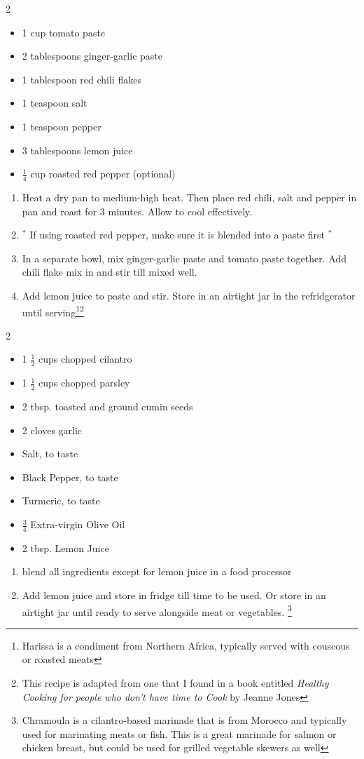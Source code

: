 \documentclass[oneside]{recipe}
\newcommand{\recipecolumn}[2]{
	\begin{multicols}{2}
	\raggedcolumns
	#1
	\columnbreak
	#2
	\end{multicols}
}
\begin{document}
\recipecolumn{
	\begin{itemize}
	\item 1 cup tomato paste
	\item 2 tablespoons ginger-garlic paste
	\item 1 tablespoon red chili flakes
	\item 1 teaspoon salt
	\item 1 teaspoon pepper
	\item 3 tablespoons lemon juice 
	\item $\frac{1}{4}$ cup roasted red pepper (optional)
	\end{itemize}
}{
	\begin{enumerate}
		\item Heat a dry pan to medium-high heat. Then place red chili, salt and pepper in pan and roast for 3 minutes. Allow to cool effectively.
		\item $^*$ If using roasted red pepper, make sure it is blended into a paste first $^*$
		\item In a separate bowl, mix ginger-garlic paste and tomato paste together. Add chili flake mix in and stir till mixed well. 
		\item Add lemon juice to paste and stir. Store in an airtight jar in the refridgerator until serving\footnote{Harissa is a condiment from Northern Africa, typically served with couscous or roasted meats}\footnote{This recipe is adapted from one that I found in a book entitled \textit{Healthy Cooking for people who don't have time to Cook} by Jeanne Jones}
	\end{enumerate}
}

\recipecolumn{
	\begin{itemize}
		\item 1 $\frac{1}{2}$ cups chopped cilantro
		\item 1 $\frac{1}{2}$ cups chopped parsley
		\item 2 tbsp. toasted and ground cumin seeds
		\item 2 cloves garlic
		\item Salt, to taste
		\item Black Pepper, to taste
		\item Turmeric, to taste
		\item $\frac{3}{4}$ Extra-virgin Olive Oil
		\item 2 tbsp. Lemon Juice
	\end{itemize}	
}{
	\begin{enumerate}
		\item blend all ingredients except for lemon juice in a food processor
		\item Add lemon juice and store in fridge till time to be used. Or store in an airtight jar until ready to serve alongside meat or vegetables.  \footnote{Chramoula is a cilantro-based marinade that is from Morocco and typically used for marinating meats or fish. This is a great marinade for salmon or chicken breast, but could be used for grilled vegetable skewers as well}

	\end{enumerate}
}
\end{document}
